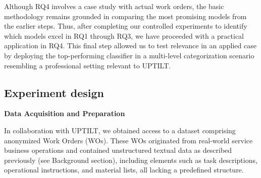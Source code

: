 Although RQ4 involves a case study with actual work orders, the basic methodology remains grounded in comparing the most promising models from the earlier steps. Thus, after completing our controlled experiments to identify which models excel in RQ1 through RQ3, we have proceeded with a practical application in RQ4. This final step allowed us to test  relevance in an applied case by deploying the top-performing classifier in a multi-level categorization scenario resembling a professional setting relevant to UPTILT.


\subsection{Experiment design}
\begin{comment}
With our collaboration we got access to an extensive dataset consisting of anonymized Work Orders (WOs) derived from genuine service business operations. Each WO represented unstructured textual information described earlier in the Background section, including task descriptions, instructions, lists of materials, and other relevant details without structured formatting.

Before starting the iterations of the experiment, we further cleaned the dataset and removed any sensitive information. A method such as tokenization and word segmentation was applied using natural language toolkit (NLTK) --- a standard toolkit found in Python and recommended by \cite{bird2009nlp}. This process involved breaking the text into tokens (words, punctuation marks, etc.) and accurately identifying word boundaries and was our first step in the process. Stop-word removal was applied using the same library, eliminating common words \textit{("the", "is", "at" and more...)} that does not contribute any significant meaning to the text when used in conjunction with ML and LLMs. The text was further cleaned from any punctuations and symbols.    
\end{comment}

\textbf{Data Acquisition and Preparation}

In collaboration with UPTILT, we obtained access to a dataset comprising anonymized Work Orders (WOs). These WOs originated from real-world service business operations and contained unstructured textual data as described previously (see Background section), including elements such as task descriptions, operational instructions, and material lists, all lacking a predefined structure.

